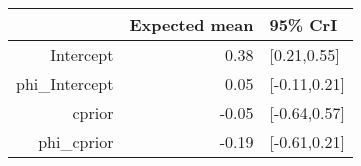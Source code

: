 \begin{tabular}{rrl}
  \hline
 & Expected mean & 95\% CrI \\ 
  \hline
Intercept & 0.38 & [0.21,0.55] \\ 
  phi\_Intercept & 0.05 & [-0.11,0.21] \\ 
  cprior & -0.05 & [-0.64,0.57] \\ 
  phi\_cprior & -0.19 & [-0.61,0.21] \\ 
   \hline
\end{tabular}

